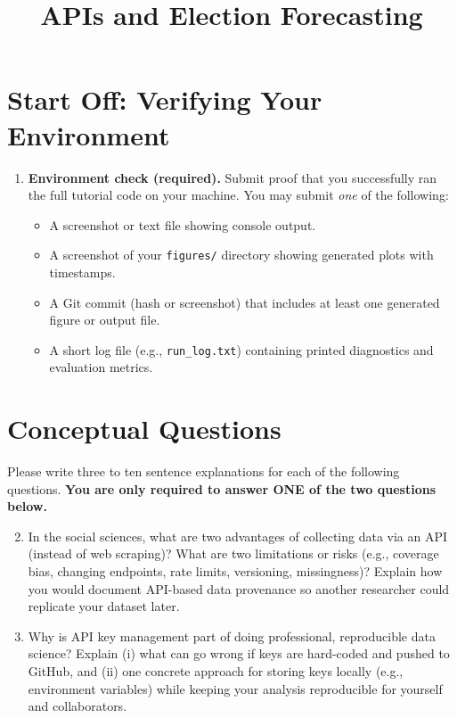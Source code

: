 \documentclass[11pt]{article}
\title{ APIs and Election Forecasting}
\author{ }
\date{ }
\begin{document}
\maketitle

\section*{Start Off: Verifying Your Environment}

\begin{enumerate}
\item \textbf{Environment check (required).}  
Submit proof that you successfully ran the full tutorial code on your machine. You may submit \emph{one} of the following:
\begin{itemize}
  \item A screenshot or text file showing console output.
  \item A screenshot of your \texttt{figures/} directory showing generated plots with timestamps.
  \item A Git commit (hash or screenshot) that includes at least one generated figure or output file.
  \item A short log file (e.g., \texttt{run\_log.txt}) containing printed diagnostics and evaluation metrics.
\end{itemize}
\end{enumerate}

\section*{Conceptual Questions}
Please write three to ten sentence explanations for each of the following questions. \textbf{You are only required to answer ONE of the two questions below.} \bigskip
 
\begin{enumerate}
\setcounter{enumi}{1}

\item In the social sciences, what are two advantages of collecting data via an API (instead of web scraping)? What are two limitations or risks (e.g., coverage bias, changing endpoints, rate limits, versioning, missingness)? Explain how you would document API-based data provenance so another researcher could replicate your dataset later.

\item Why is API key management part of doing professional, reproducible data science? Explain (i) what can go wrong if keys are hard-coded and pushed to GitHub, and (ii) one concrete approach for storing keys locally (e.g., environment variables) while keeping your analysis reproducible for yourself and collaborators.

  \end{enumerate}
\end{document}
